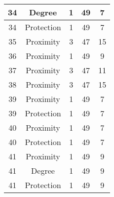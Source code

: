 \documentclass[results.tex]{subfiles}
\begin{document}
\begin{center}
\begin{tabular}{| c || c | c | c | c |}
            \hline
            34                      & Degree                       & 1                      & 49                      & 7                    \\
            \hline
            34                      & Protection                   & 1                      & 49                      & 7                    \\
            \hline
            35                      & Proximity                    & 3                      & 47                      & 15                   \\
            \hline
            36                      & Proximity                    & 1                      & 49                      & 9                    \\
            \hline
            37                      & Proximity                    & 3                      & 47                      & 11                   \\
            \hline
            38                      & Proximity                    & 3                      & 47                      & 15                   \\
            \hline
            39                      & Proximity                    & 1                      & 49                      & 7                    \\
            \hline
            39                      & Protection                   & 1                      & 49                      & 7                    \\
            \hline
            40                      & Proximity                    & 1                      & 49                      & 7                    \\
            \hline
            40                      & Protection                   & 1                      & 49                      & 7                    \\
            \hline
            41                      & Proximity                    & 1                      & 49                      & 9                    \\
            \hline
            41                      & Degree                       & 1                      & 49                      & 9                    \\
            \hline
            41                      & Protection                   & 1                      & 49                      & 9                    \\

\end{tabular}
\end{center}
\end{document}
